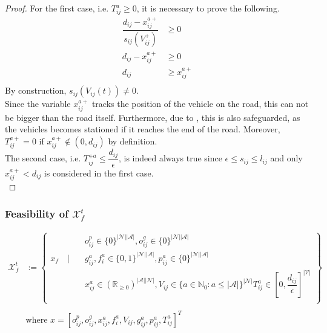 \begin{proof}
For the first case, i.e. $T_{ij}^{a} \ge 0$, it is necessary to prove the following. 
\begin{align*}
	\dfrac{d_{ij} - x_{ij}^{a+}}{s_{ij}(V^+_{ij})} &\ge 0\\
	d_{ij} - x_{ij}^{a+} &\ge 0\\
	d_{ij} &\ge x_{ij}^{a+}\\
\end{align*}
By construction, $s_{ij}(V_{ij}(t)) \neq 0$.\\
Since the variable $x_{ij}^{a+}$ tracks the position of the vehicle on the road, this can not be bigger than the road itself. Furthermore, due to , this is also safeguarded, as the vehicles becomes stationed if it reaches the end of the road. Moreover, $T_{ij}^{a+} =0$ if $x_{ij}^{a+} \not\in  (0,d_{ij})$ by definition. \\
The second case, i.e. $T_{ij}^{+a} \leq \dfrac{d_{ij}}{\epsilon}$, is indeed always true since $\epsilon \leq s_{ij} \leq l_{ij}$ and only $x_{ij}^{a+} < d_{ij}$ is considered in the first case.\\
\end{proof}
\subsubsection{Feasibility of $\mathcal{X}^t_f$}
\begin{equation}
	\begin{aligned}
		\mathcal{X}^t_f &:= \left\{
		\begin{aligned}
			& o^p_{ij} \in \{0\}^{|\mathcal{N}||\mathcal{A}|} , o^g_{ij} \in \{0\}^{|\mathcal{N}||\mathcal{A}|}  \\
			x_f \quad \Bigg| \quad &g^a_{ij},f^a_{i} \in \{0,1\}^{|\mathcal{N}||\mathcal{A}|},  p^a_{ij}\in \{0\}^{|\mathcal{N}||\mathcal{A}|}\\%
			&  x_{ij}^a\in (\mathbb{R}_{\ge 0})^{|\mathcal{A}||\mathcal{N}|}, V_{ij} \in \{ a \in \mathbb{N}_0: a \leq |\mathcal{A}| \}^{|\mathcal{N}|} T^a_{ij} \in [0, \dfrac{d_{ij}}{\epsilon}]^{|\mathcal{V}|}\\%
		\end{aligned}
		\right\}\\
		&\\
		&\text{where }  x = [o^p_{ij},o^g_{ij}, x_{ij}^a, f^a_{i}, V_{ij} , g^a_{ij}, p^a_{ij}, T^a_{ij}]^T
	\end{aligned}
	\label{appendix:eq:final_x_f}
\end{equation}\\

